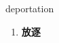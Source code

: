 
\begin{frame}
{\huge deportation}
\begin{center}
\begin{enumerate}\Large
  \item \textbf{放逐}
\end{enumerate}
\end{center}
\end{frame}
